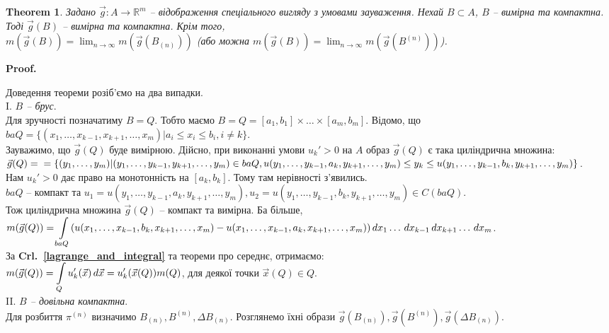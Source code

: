 \documentclass[a4paper, 10pt]{article}
\makeatletter
\def\qed{$\blacksquare$}
\theoremstyle{theoremdd}
\newtheorem{theorem}{Theorem}[subsection]
\theoremstyle{theoremdd}
\theoremstyle{theoremdd}
\theoremstyle{theoremdd}
\theoremstyle{theoremdd}
\theoremstyle{theoremdd}
\theoremstyle{theoremdd}
\theoremstyle{theoremdd}
\renewenvironment{proof}[1][Proof.\\]{\par
\pushQED{\hfill \qed}%
\normalfont \topsep6\p@\@plus6\p@\relax
\trivlist
\item\relax
{\bfseries
#1\@addpunct{.}}\hspace\labelsep\ignorespaces
}{%
\popQED\endtrivlist\@endpefalse
}
\newcommand\crlref[1]{\textbf{Crl.~\ref{#1}}}
\makeatother
\begin{document}
\begin{theorem}
Задано $\vec{g} \colon A \to \mathbb{R}^m$ -- відображення спеціального вигляду з умовами зауваження. Нехай $B \subset A$, $B$ -- вимірна та компактна. Тоді $\vec{g}(B)$ -- вимірна та компактна. Крім того,\\
$m(\vec{g}(B)) = \displaystyle\lim_{n \to \infty} m(\vec{g}(B_{(n)}))$ (або можна $m(\vec{g}(B)) = \displaystyle\lim_{n \to \infty} m(\vec{g}(B^{(n)}))$).
\end{theorem}

\begin{proof}
Доведення теореми розіб'ємо на два випадки.\\
I. \textit{$B$ -- брус}.\\
Для зручності позначатиму $B = Q$. Тобто маємо $B = Q = [a_1,b_1] \times \dots \times [a_m,b_m]$. Відомо, що $baQ = \{(x_1,\dots,x_{k-1},x_{k+1},\dots,x_m) | a_i \leq x_i \leq b_i, i \neq k\}$.\\
Зауважимо, що $\vec{g}(Q)$ буде вимірною. Дійсно, при виконанні умови $u_k'>0$ на $A$ образ $\vec{g}(Q)$ є така циліндрична множина: $\vec{g}(Q) = \\ =\{(y_1,\dots,y_m) | (y_1,\dots,y_{k-1},y_{k+1},\dots,y_m) \in baQ, u(y_1,\dots,y_{k-1},a_k,y_{k+1},\dots,y_m) \leq y_k \leq u(y_1,\dots,y_{k-1},b_k,y_{k+1},\dots,y_m)\}$.\\
Нам $u_k' > 0$ дає право на монотонність на $[a_k,b_k]$. Тому там нерівності з'явились.\\
$baQ$ -- компакт та $u_1 = u(y_1,\dots,y_{k-1},a_k,y_{k+1},\dots,y_m), u_2 = u(y_1,\dots,y_{k-1},b_k,y_{k+1},\dots,y_m) \in C(baQ)$.\\
Тож циліндрична множина $\vec{g}(Q)$ -- компакт та вимірна. Ба більше,\\
$m(\vec{g}(Q)) = \displaystyle\int\displaylimits_{baQ} (u(x_1,\dots,x_{k-1},b_k,x_{k+1},\dots,x_m) - u(x_1,\dots,x_{k-1},a_k,x_{k+1},\dots,x_m))\,dx_1\dots\,dx_{k-1}\,dx_{k+1}\dots\,dx_m$.\\
За \crlref{lagrange_and_integral} та теореми про середнє, отримаємо:\\
$m(\vec{g}(Q)) = \displaystyle\int\displaylimits_Q u'_k(\vec{x})\,d\vec{x} = u_k'(\vec{x}(Q)) m(Q)$, для деякої точки $\vec{x}(Q) \in Q$.
\bigskip \\
II. \textit{$B$ -- довільна компактна}.\\
Для розбиття $\pi^{(n)}$ визначимо $B_{(n)}, B^{(n)}, \Delta B_{(n)}$. Розглянемо їхні образи $\vec{g}(B_{(n)}), \vec{g}(B^{(n)}), \vec{g}(\Delta B_{(n)})$.\\

\end{proof}
\end{document}
